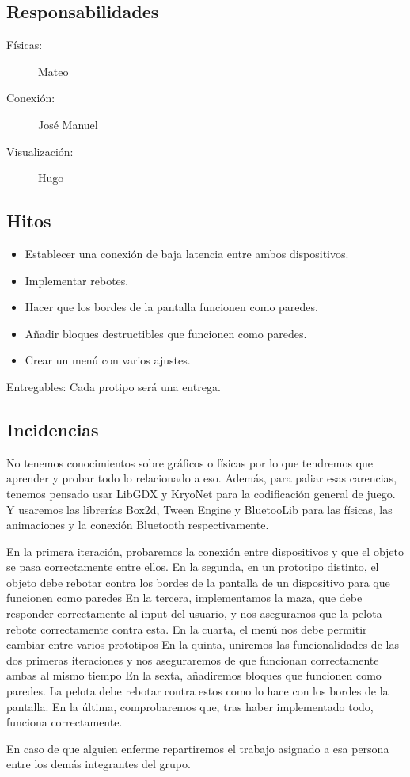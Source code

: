 \documentclass[a4paper,openright,12pt]{article}
\begin{document}
\subsection{Responsabilidades}
\begin{description}

\item[Físicas:] Mateo 
\item[Conexión:] José Manuel
\item[Visualización:] Hugo
\end{description}

\subsection{Hitos}
\begin{itemize}
\item Establecer una conexión de baja latencia entre ambos dispositivos.
\item Implementar rebotes.
\item Hacer que los bordes de la pantalla funcionen como paredes.
\item Añadir bloques destructibles que funcionen como paredes.
\item Crear un menú con varios ajustes.
\end{itemize}

Entregables:
Cada protipo será una entrega.

\subsection{Incidencias}
No tenemos conocimientos sobre gráficos o físicas por lo que tendremos que aprender y probar todo lo relacionado a eso. Además, para paliar esas carencias, tenemos pensado usar LibGDX\cite{misc-libGDX} y KryoNet\cite{misc-kryonetl} para la codificación general de juego. Y usaremos las librerías Box2d\cite{misc-box2d}, Tween Engine\cite{misc-tween} y BluetooLib\cite{misc-bluetooth} para las físicas, las animaciones y la conexión Bluetooth respectivamente.
\par
En la primera iteración, probaremos la conexión entre dispositivos y que el objeto se pasa correctamente entre ellos.
En la segunda, en un prototipo distinto, el objeto debe rebotar contra los bordes de la pantalla de un dispositivo para que funcionen como paredes
En la tercera, implementamos la maza, que debe responder correctamente al input del usuario, y nos aseguramos que la pelota rebote correctamente contra esta.
En la cuarta, el menú nos debe permitir cambiar entre varios prototipos
En la quinta, uniremos las funcionalidades de las dos primeras iteraciones y nos aseguraremos de que funcionan correctamente ambas al mismo tiempo
En la sexta, añadiremos bloques que funcionen como paredes. La pelota debe rebotar contra estos como lo hace con los bordes de la pantalla.
En la última, comprobaremos que, tras haber implementado todo, funciona correctamente.
\par
En caso de que alguien enferme repartiremos el trabajo asignado a esa persona entre los demás integrantes del grupo.
\end{document}
